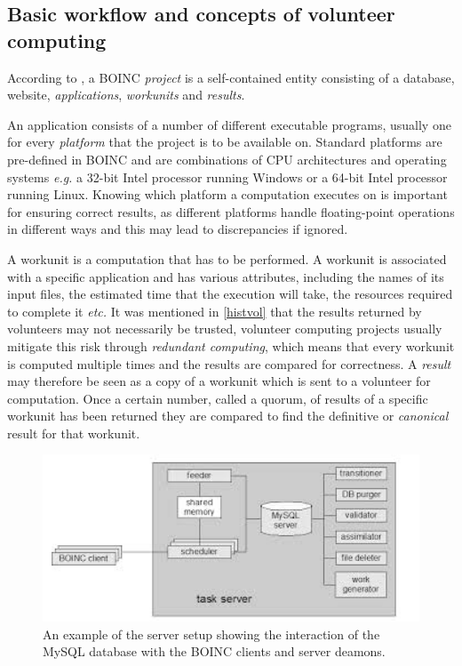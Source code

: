  \subsection{Basic workflow and concepts of volunteer computing} \label{Bconcepts}
According to \cite{boincwiki}, a BOINC \emph{project} is a self-contained entity consisting of a  database, website, \emph{applications}, \emph{workunits} and \emph{results}.

An application consists of a number of different executable programs, usually one for every \emph{platform} that the project is to be available on. Standard platforms are pre-defined in BOINC and are   combinations of CPU architectures and operating systems \emph{e.g.} a 32-bit Intel processor running Windows or a 64-bit Intel processor running Linux. Knowing which platform a computation executes on is important for ensuring correct results, as different platforms handle floating-point operations in different ways and this may lead to discrepancies if ignored.

A workunit is a computation that has to be performed. A workunit is associated with a specific application and has various attributes, including the names of its input files, the estimated time that the execution will take, the resources required to complete it \emph{etc.} It was mentioned in \ref{histvol} that the results returned by volunteers may not necessarily be trusted, volunteer computing projects usually mitigate this risk through \emph{redundant computing}, which means that every workunit is computed multiple times and the results are compared for correctness. A \emph{result} may therefore be seen as a copy of a workunit which is sent to a volunteer for computation.  Once a certain number, called a quorum, of results of a specific workunit has been returned they are compared to find the definitive or \emph{canonical} result for that workunit.
\begin{figure}[htb]
\centering
\includegraphics[width=14cm]{images/serversetup}
\caption{An example of the server setup showing the interaction of the MySQL database with the BOINC clients and server deamons.}\label{fig:server}
\end{figure}

